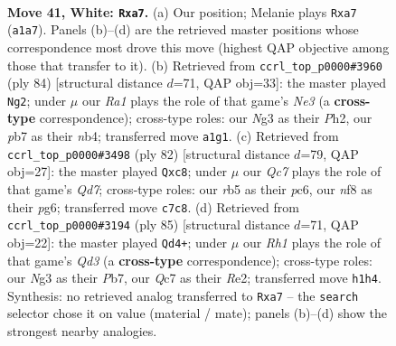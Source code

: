 \documentclass[11pt]{article}
\begin{document}
\clearpage

\begin{figure}[p]\centering
\begin{subfigure}{0.46\textwidth}\centering
\resizebox{\linewidth}{!}{%
\newchessgame
\chessboard[
  setfen={5n1k/ppQ4p/7p/1r6/3q4/6N1/6K1/R6R w - - 0 41},
  showmover=false,
  pgfstyle=straightmove, color=movearrow, markmove={a1-a7}
]}
\caption{}
\end{subfigure}\hfill
\begin{subfigure}{0.46\textwidth}\centering
\resizebox{\linewidth}{!}{%
\newchessgame
\chessboard[
  setfen={8/4p3/4b1kp/2Q5/1n2q1p1/4N3/7P/5RK1 w - - 3 43},
  showmover=false,
  pgfstyle=straightmove, color=movearrow, markmove={e3-g2}
]}
\caption{}
\end{subfigure}
\\[4pt]
\begin{subfigure}{0.46\textwidth}\centering
\resizebox{\linewidth}{!}{%
\newchessgame
\chessboard[
  setfen={2r5/1p1Q3n/2pp2pk/8/p1P5/5q2/8/3RR1K1 w - - 0 42},
  showmover=false,
  pgfstyle=straightmove, color=movearrow, markmove={d7-c8}
]}
\caption{}
\end{subfigure}\hfill
\begin{subfigure}{0.46\textwidth}\centering
\resizebox{\linewidth}{!}{%
\newchessgame
\chessboard[
  setfen={5k2/1p6/3q1r2/6Q1/6P1/3N1P2/P3r1P1/2R3K1 b - - 14 43},
  showmover=false,
  pgfstyle=straightmove, color=movearrow, markmove={d6-d4}
]}
\caption{}
\end{subfigure}
\caption{\textbf{Move 41, White: \texttt{Rxa7}.} (a) Our position; Melanie plays \texttt{Rxa7} (\texttt{a1a7}). Panels (b)--(d) are the retrieved master positions whose correspondence most drove this move (highest QAP objective among those that transfer to it). (b) Retrieved from \texttt{ccrl\_top\_p0000\#3960} (ply 84) [structural distance $d$=71, QAP obj=33]: the master played \texttt{Ng2}; under $\mu$ our \emph{Ra1} plays the role of that game's \emph{Ne3} (a \textbf{cross-type} correspondence); cross-type roles: our \emph{N}g3 as their \emph{P}h2, our \emph{p}b7 as their \emph{n}b4; transferred move \texttt{a1g1}. (c) Retrieved from \texttt{ccrl\_top\_p0000\#3498} (ply 82) [structural distance $d$=79, QAP obj=27]: the master played \texttt{Qxc8}; under $\mu$ our \emph{Qc7} plays the role of that game's \emph{Qd7}; cross-type roles: our \emph{r}b5 as their \emph{p}c6, our \emph{n}f8 as their \emph{p}g6; transferred move \texttt{c7c8}. (d) Retrieved from \texttt{ccrl\_top\_p0000\#3194} (ply 85) [structural distance $d$=71, QAP obj=22]: the master played \texttt{Qd4+}; under $\mu$ our \emph{Rh1} plays the role of that game's \emph{Qd3} (a \textbf{cross-type} correspondence); cross-type roles: our \emph{N}g3 as their \emph{P}b7, our \emph{Q}c7 as their \emph{R}e2; transferred move \texttt{h1h4}. Synthesis: no retrieved analog transferred to \texttt{Rxa7} -- the \texttt{search} selector chose it on value (material / mate); panels (b)--(d) show the strongest nearby analogies.}
\label{fig:thought-m80}
\end{figure}
\end{document}
